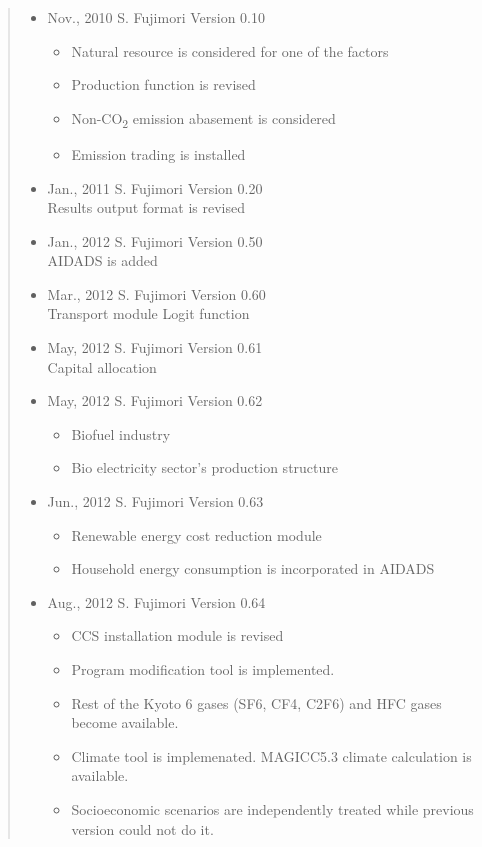 \documentclass[10pt,a4paper,titlepage,dvipdfmx]{book}
\begin{document}
\begin{quote}
\begin{itemize}
  \item Nov., 2010 S. Fujimori Version 0.10
    \begin{itemize}
      \item Natural resource is considered for one of the factors
      \item Production function is revised
      \item Non-CO\textsubscript{2} emission abasement is considered 
      \item Emission trading is installed
    \end{itemize}

  \item Jan., 2011 S. Fujimori Version 0.20  \mbox{}\\
      Results output format is revised

  \item Jan., 2012 S. Fujimori Version 0.50 \mbox{}\\
      AIDADS is added

  \item Mar., 2012 S. Fujimori Version 0.60 \mbox{}\\
     Transport module
     Logit function

  \item May, 2012 S. Fujimori Version 0.61  \mbox{}\\
      Capital allocation

  \item May, 2012 S. Fujimori Version 0.62
    \begin{itemize}
      \item Biofuel industry
      \item Bio electricity sector's production structure
    \end{itemize}

  \item Jun., 2012 S. Fujimori Version 0.63 \mbox{}\\
    \begin{itemize}
      \item Renewable energy cost reduction module
      \item Household energy consumption is incorporated in AIDADS
    \end{itemize}

  \item Aug., 2012 S. Fujimori Version 0.64
    \begin{itemize}
      \item CCS installation module is revised
      \item Program modification tool is implemented.
      \item Rest of the Kyoto 6 gases (SF6, CF4, C2F6) and HFC gases become available. 
      \item Climate tool is implemenated. MAGICC5.3 climate calculation is available.
      \item Socioeconomic scenarios are independently treated while previous version could not do it.
    \end{itemize}


\end{itemize}
\end{quote}
\end{document}
